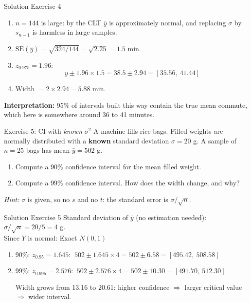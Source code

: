 \documentclass[
  11pt,
  ignorenonframetext,
  aspectratio=169,
]{beamer}
\providecommand{\tightlist}{%
  \setlength{\itemsep}{0pt}\setlength{\parskip}{0pt}}
\newcommand{\se}{\mathrm{SE}}
\begin{document}
\begin{frame}{Solution Exercise 4}
\protect{}\label{solution-exercise-4}
\begin{enumerate}
\tightlist
\item
  \(n=144\) is large: by the CLT \(\bar y\) is approximately normal, and
  replacing \(\sigma\) by \(s_{n-1}\) is harmless in large samples.
\item
  \(\se(\bar y)=\sqrt{324/144}=\sqrt{2.25}=\mathbf{1.5}\) min.
\item
  \(z_{0.975}=1.96\):
  \[\bar y\pm1.96\times1.5=38.5\pm2.94=\mathbf{[35.56,\ 41.44]}\]
\item
  Width \(=2\times2.94=\mathbf{5.88}\) min.
\end{enumerate}

\textbf{Interpretation:} 95\% of intervals built this way contain the
true mean commute, which here is somewhere around 36 to 41 minutes.
\end{frame}

\begin{frame}{Exercise 5: CI with \emph{known} \(\sigma^2\)}
\protect{}\label{exercise-5-ci-with-known-sigma2}
A machine fills rice bags. Filled weights are normally distributed with
a \textbf{known} standard deviation \(\sigma=20\) g. A sample of
\(n=25\) bags has mean \(\bar y=502\) g.

\begin{enumerate}
\tightlist
\item
  Compute a 90\% confidence interval for the mean filled weight.
\item
  Compute a 99\% confidence interval. How does the width change, and
  why?
\end{enumerate}

\emph{Hint:} \(\sigma\) is given, so no \(s\) and no \(t\): the standard
error is \(\sigma/\sqrt n\).
\end{frame}

\begin{frame}{Solution Exercise 5}
\protect{}\label{solution-exercise-5}
Standard deviation of \(\bar y\) (no estimation needed):
\(\sigma/\sqrt n=20/5=4\) g. \\
Since \(Y\) is normal: Exact \(N(0,1)\)

\begin{enumerate}
\item
  90\%: \(z_{0.95}=1.645\):
  \(\ 502\pm1.645\times4=502\pm6.58=\mathbf{[495.42,\ 508.58]}\)
\item
  99\%: \(z_{0.995}=2.576\):
  \(\ 502\pm2.576\times4=502\pm10.30=\mathbf{[491.70,\ 512.30]}\)

  Width grows from 13.16 to 20.61: higher confidence \(\Rightarrow\)
  larger critical value \(\Rightarrow\) wider interval.
\end{enumerate}
\end{frame}
\end{document}
